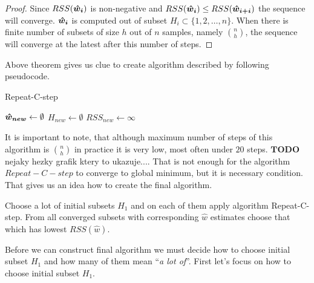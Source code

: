 \begin{proof}
	Since  $RSS(\boldsymbol{\hat{w}_{i}})$ is non-negative and $RSS(\boldsymbol{\hat{w}_{i}}) \leq RSS(\boldsymbol{\hat{w}_{i+i}})$ the 
	sequence will converge. $\boldsymbol{\hat{w}_{i}}$  is computed out of subset 
	$H_i \subset \{{1,2,\ldots,n\}}$. When there is finite number of subsets of size $h$ out of $n$ samples, namely ${n \choose h}$, the sequence will converge at the latest after this number of steps.
\end{proof}

Above theorem gives us clue to create algorithm described by following pseudocode.

\begin{algorithm}[H]
	\label{alg:RepeatCstep}
	\caption{Repeat-C-step}
	$\boldsymbol{\hat{w}_{new}} \gets \emptyset$\;
	$H_{new} \gets \emptyset$\;
	$RSS_{new} \gets \infty $\;


	\;
\end{algorithm}

It is important to note, that although maximum number of steps of this algorithm is ${n \choose h}$ in practice it is very low, most often under $20$ steps. $\boldsymbol{TODO}$ nejaky hezky grafik ktery to ukazuje....
That is not enough for the algorithm $Repeat-C-step$ to converge to global minimum, but it is necessary condition. That gives us an idea how to create the final algorithm. \cite{rouss:2000}

Choose a lot of initial subsets $H_1$ and on each of them apply algorithm Repeat-C-step. From all converged subsets with corresponding $\hat{w}$ estimates choose that which has lowest $RSS(\hat{w})$. 

Before we can construct final algorithm we must decide how to choose initial subset $H_1$ and how many of them mean ``\emph{a lot of}''. First let's focus on how to choose initial subset $H_1$.



